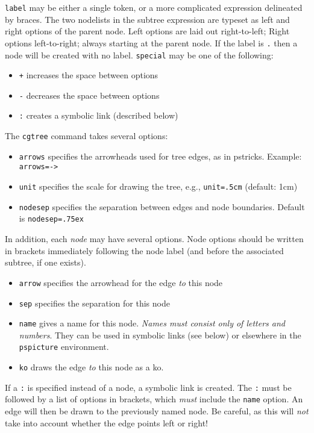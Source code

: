 \documentclass{article}
\begin{document}
\texttt{label} may be either a single token, or a more complicated expression delineated by braces.  The two nodelists in the subtree expression are typeset as left and right options of the parent node.  Left options are laid out right-to-left; Right options left-to-right; always starting at the parent node.  If the label is \texttt{.} then a node will be created with no label.  \texttt{special} may be one of the following:

\begin{itemize}
\item \texttt{+} increases the space between options
\item \texttt{-} decreases the space between options
\item \texttt{:} creates a symbolic link (described below)
\end{itemize}

The \texttt{cgtree} command takes several options:

\begin{itemize}
\item \texttt{arrows} specifies the arrowheads used for tree edges, as in pstricks.  Example: \texttt{arrows=->}
\item \texttt{unit} specifies the scale for drawing the tree, e.g., \texttt{unit=.5cm} (default: 1cm)
\item \texttt{nodesep} specifies the separation between edges and node boundaries.  Default is \texttt{nodesep=.75ex}
\end{itemize}

In addition, each \emph{node} may have several options.  Node options should be written in brackets immediately following the node label (and before the associated subtree, if one exists).

\begin{itemize}
\item \texttt{arrow} specifies the arrowhead for the edge \emph{to} this node
\item \texttt{sep} specifies the separation for this node
\item \texttt{name} gives a name for this node.  \emph{Names must consist only of letters and numbers}.  They can be used in symbolic links (see below) or elsewhere in the \texttt{pspicture} environment.
\item \texttt{ko} draws the edge \emph{to} this node as a ko.
\end{itemize}

If a \texttt{:} is specified instead of a node, a symbolic link is created.  The \texttt{:} must be followed by a list of options in brackets, which \emph{must} include the \texttt{name} option.  An edge will then be drawn to the previously named node.  Be careful, as this will \emph{not} take into account whether the edge points left or right!
\end{document}
